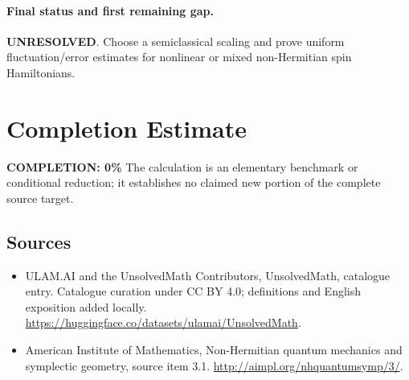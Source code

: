 \documentclass[11pt]{article}
\begin{document}
\paragraph{Final status and first remaining gap.}
\textbf{UNRESOLVED}. Choose a semiclassical scaling and prove uniform fluctuation/error estimates for nonlinear or mixed non-Hermitian spin Hamiltonians.

\section{Completion Estimate}
\noindent\textbf{COMPLETION: 0\%}
The calculation is an elementary benchmark or conditional reduction; it establishes no claimed new portion of the complete source target.

\subsection{Sources}
\begin{itemize}
\item[\hypertarget{source:statement:1}{S1}] ULAM.AI and the UnsolvedMath Contributors, UnsolvedMath, catalogue entry. Catalogue curation under CC BY 4.0; definitions and English exposition added locally.
\url{https://huggingface.co/datasets/ulamai/UnsolvedMath}.
\item[\hypertarget{source:statement:2}{S2}] American Institute of Mathematics, Non-Hermitian quantum mechanics and symplectic geometry, source item 3.1.
\url{http://aimpl.org/nhquantumsymp/3/}.
\end{itemize}
\label{end:statement}
\end{document}
